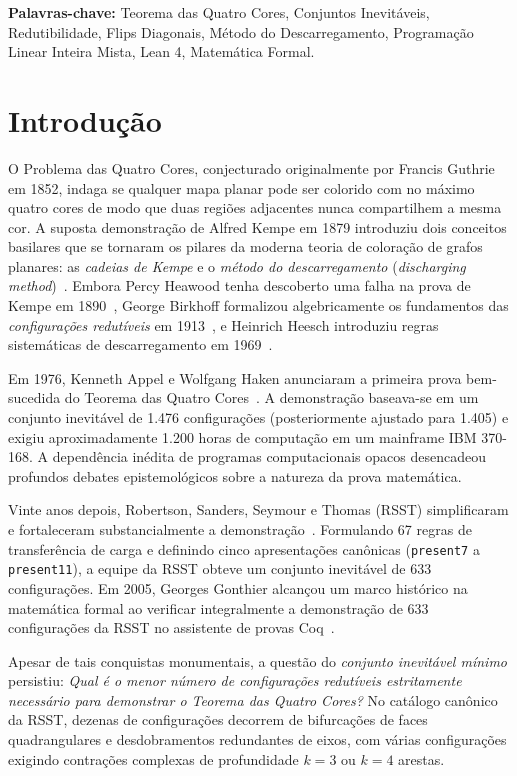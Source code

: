 \documentclass[11pt,a4paper]{article}
\theoremstyle{plain}
\theoremstyle{definition}
\begin{document}
\noindent\textbf{Palavras-chave:} Teorema das Quatro Cores, Conjuntos Inevitáveis, Redutibilidade, Flips Diagonais, Método do Descarregamento, Programação Linear Inteira Mista, Lean 4, Matemática Formal.

\section{Introdução}

O Problema das Quatro Cores, conjecturado originalmente por Francis Guthrie em 1852, indaga se qualquer mapa planar pode ser colorido com no máximo quatro cores de modo que duas regiões adjacentes nunca compartilhem a mesma cor. A suposta demonstração de Alfred Kempe em 1879 introduziu dois conceitos basilares que se tornaram os pilares da moderna teoria de coloração de grafos planares: as \emph{cadeias de Kempe} e o \emph{método do descarregamento} (\emph{discharging method})~\cite{kempe1879geographical}. Embora Percy Heawood tenha descoberto uma falha na prova de Kempe em 1890~\cite{heawood1890map}, George Birkhoff formalizou algebricamente os fundamentos das \emph{configurações redutíveis} em 1913~\cite{birkhoff1913reducibility}, e Heinrich Heesch introduziu regras sistemáticas de descarregamento em 1969~\cite{heesch1969untersuchungen}.

Em 1976, Kenneth Appel e Wolfgang Haken anunciaram a primeira prova bem-sucedida do Teorema das Quatro Cores~\cite{appel1977every1, appel1977every2}. A demonstração baseava-se em um conjunto inevitável de 1.476 configurações (posteriormente ajustado para 1.405) e exigiu aproximadamente 1.200 horas de computação em um mainframe IBM 370-168. A dependência inédita de programas computacionais opacos desencadeou profundos debates epistemológicos sobre a natureza da prova matemática.

Vinte anos depois, Robertson, Sanders, Seymour e Thomas (RSST) simplificaram e fortaleceram substancialmente a demonstração~\cite{robertson1997four}. Formulando 67 regras de transferência de carga e definindo cinco apresentações canônicas (\texttt{present7} a \texttt{present11}), a equipe da RSST obteve um conjunto inevitável de 633 configurações. Em 2005, Georges Gonthier alcançou um marco histórico na matemática formal ao verificar integralmente a demonstração de 633 configurações da RSST no assistente de provas Coq~\cite{gonthier2008formal}.

Apesar de tais conquistas monumentais, a questão do \emph{conjunto inevitável mínimo} persistiu: \emph{Qual é o menor número de configurações redutíveis estritamente necessário para demonstrar o Teorema das Quatro Cores?} No catálogo canônico da RSST, dezenas de configurações decorrem de bifurcações de faces quadrangulares e desdobramentos redundantes de eixos, com várias configurações exigindo contrações complexas de profundidade $k = 3$ ou $k = 4$ arestas.
\end{document}
